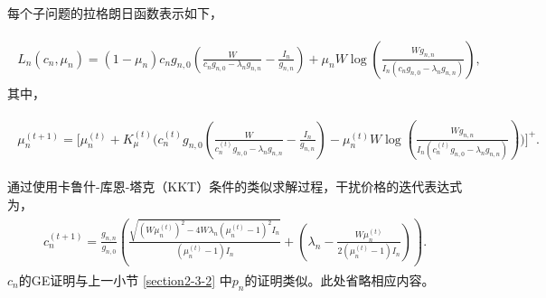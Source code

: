 每个子问题的拉格朗日函数表示如下，

\begin{eqnarray}\label{28}
\begin{array}{lll}
\!\!\!\!\textit{L}_n(c_n, \mu_n)=(1-\mu_n)c_{n} g_{n,0}\left(\frac{W}{c_n g_{n,0}-\lambda_n g_{n,n}}-\frac{I_n}{g_{n,n}}\right)
+\mu_n W \log\left(\frac{W g_{n,n}}{I_n (c_n g_{n,0}-\lambda_n g_{n,n}) }\right) ,
\end{array}
\end{eqnarray}
其中，

\begin{eqnarray}\label{29}
\begin{array}{lll}
\!\!\!\mu_n^{(t+1)}=\Big[\mu_n^{(t)}\!\!+\!K_{\mu}^{(t)}\big(c_{n}^{(t)} g_{n,0}(\frac{W}{c_n^{(t)} g_{n,0}-\lambda_n g_{n,n}}-\frac{I_n}{g_{n,n}})-\mu_n^{(t)} W \log(\frac{W g_{n,n}}{I_n (c_n^{(t)} g_{n,0}-\lambda_n g_{n,n}) })\big)\Big]^+ .
\end{array}
\end{eqnarray}

通过使用卡鲁什-库恩-塔克（KKT）条件的类似求解过程，干扰价格的迭代表达式为，
\begin{eqnarray}\label{30}
 \begin{array}{lll}
\!\!\!\!c_n^{(t+1)}\!\!\!=\!\!\frac{g_{n,n}}{g_{n,0}}\!\!\left(\!\!\frac{ \sqrt{(W\mu_n^{(t)})^{2}\!-4W\lambda_n(\mu_n^{(t)}\!\!-\!1)^2I_n}}{(\mu_n^{(t)}-1)I_n}\!\!+\!\! (\lambda_n\!\!\!-\!\!\frac{W\mu_n^{(t)}}{2(\mu_n^{(t)}\!\!-\!1)I_n})\!\!\right).\!\!\!\!
\end{array}
\end{eqnarray}
$c_n$的GE证明与上一小节 \ref{section2-3-2} 中$p_n$的证明类似。此处省略相应内容。
